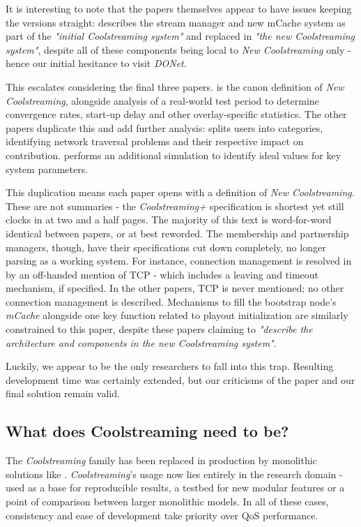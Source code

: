 \documentclass[12pt,a4paper]{article}
\begin{document}
It is interesting to note that the papers themselves appear to have issues keeping the versions straight:  \cite{Li2008} describes the stream manager and new mCache system as part of the \textit{"initial Coolstreaming system"} and replaced in \textit{"the new Coolstreaming system"}, despite all of these components being local to \textit{New Coolstreaming} only - hence our initial hesitance to visit \textit{DONet}.

This escalates considering the final three papers. \cite{Xie2007} is the canon definition of \textit{New Coolstreaming}, alongside analysis of a real-world test period to determine convergence rates, start-up delay and other overlay-specific statistics. The other papers duplicate this and add further analysis: \cite{Li2007} splits users into categories, identifying network traversal problems and their respective impact on contribution. \cite{Li2008} performs an additional simulation to identify ideal values for key system parameters.

This duplication means each paper opens with a definition of \textit{New Coolstreaming}. These are not summaries - the \textit{Coolstreaming+} specification is shortest yet still clocks in at two and a half pages. The majority of this text is word-for-word identical between papers, or at best reworded. The membership and partnership managers, though, have their specifications cut down completely, no longer parsing as a working system. For instance, connection management is resolved in \cite{Xie2007} by an off-handed mention of TCP - which includes a leaving and timeout mechanism, if specified. In the other papers, TCP is never mentioned; no other connection management is described. Mechanisms to fill the bootstrap node's \textit{mCache} alongside one key function related to playout initialization are similarly constrained to this paper, despite these papers claiming to \textit{"describe the architecture and components in the new Coolstreaming system"}.

Luckily, we appear to be the only researchers to fall into this trap. Resulting development time was certainly extended, but our criticisms of the paper and our final solution remain valid.

\subsection{What does Coolstreaming need to be?} \label{problems:what}
The \textit{Coolstreaming} family has been replaced in production by monolithic solutions like . \textit{Coolstreaming}'s usage now lies entirely in the research domain - used as a base for reproducible results, a testbed for new modular features or a point of comparison between larger monolithic models. In all of these cases, consistency and ease of development take priority over QoS performance.
\end{document}
